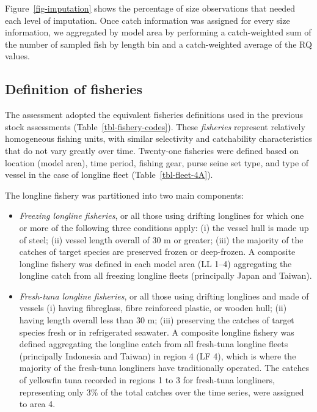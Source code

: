 \documentclass[
]{scrartcl}
\begin{document}
Figure~\ref{fig-imputation} shows the percentage of size observations
that needed each level of imputation. Once catch information was
assigned for every size information, we aggregated by model area by
performing a catch-weighted sum of the number of sampled fish by length
bin and a catch-weighted average of the RQ values.

\subsection{Definition of fisheries}\label{definition-of-fisheries}

The assessment adopted the equivalent fisheries definitions used in the
previous stock assessments (Table~\ref{tbl-fishery-codes}). These
\emph{fisheries} represent relatively homogeneous fishing units, with
similar selectivity and catchability characteristics that do not vary
greatly over time. Twenty-one fisheries were defined based on location
(model area), time period, fishing gear, purse seine set type, and type
of vessel in the case of longline fleet (Table~\ref{tbl-fleet-4A}).

The longline fishery was partitioned into two main components:

\begin{itemize}
\item
  \emph{Freezing longline fisheries}, or all those using drifting
  longlines for which one or more of the following three conditions
  apply: (i) the vessel hull is made up of steel; (ii) vessel length
  overall of 30 m or greater; (iii) the majority of the catches of
  target species are preserved frozen or deep-frozen. A composite
  longline fishery was defined in each model area (LL 1--4) aggregating
  the longline catch from all freezing longline fleets (principally
  Japan and Taiwan).
\item
  \emph{Fresh-tuna longline fisheries}, or all those using drifting
  longlines and made of vessels (i) having fibreglass, fibre reinforced
  plastic, or wooden hull; (ii) having length overall less than 30 m;
  (iii) preserving the catches of target species fresh or in
  refrigerated seawater. A composite longline fishery was defined
  aggregating the longline catch from all fresh-tuna longline fleets
  (principally Indonesia and Taiwan) in region 4 (LF 4), which is where
  the majority of the fresh-tuna longliners have traditionally operated.
  The catches of yellowfin tuna recorded in regions 1 to 3 for
  fresh-tuna longliners, representing only 3\% of the total catches over
  the time series, were assigned to area 4.
\end{itemize}
\end{document}
